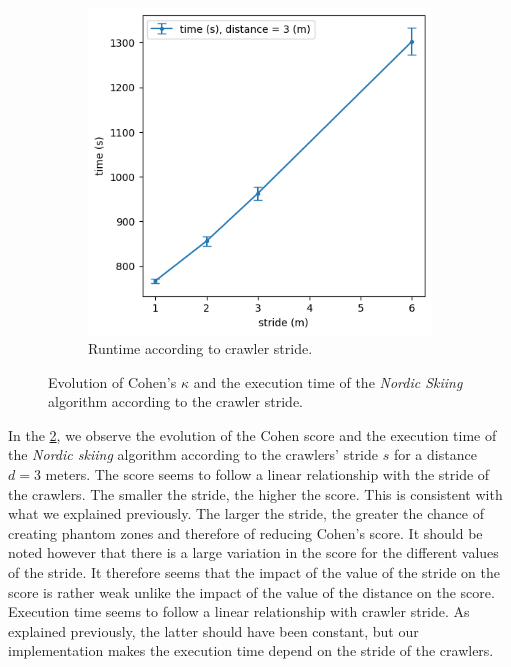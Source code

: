 \begin{figure}[h!]
\begin{subfigure}[t]{0.49\linewidth}
		\includegraphics[width=\linewidth]{graphics/ski_nordique-time_vs_stride.png}
		\caption{Runtime according to crawler stride.}
		\label{fig:ski_nordique-time_vs_stride}
	\end{subfigure}
	\caption{Evolution of Cohen's $\kappa$ and the execution time of the \textit{Nordic Skiing} algorithm according to the crawler stride.}
	\label{fig:ski_nordique-stride}
\end{figure}

In the \ref{fig:ski_nordique-stride}, we observe the evolution of the Cohen score and the execution time of the \textit{Nordic skiing} algorithm according to the crawlers' stride $s$ for a distance $d = 3$ meters.
The score seems to follow a linear relationship with the stride of the crawlers.
The smaller the stride, the higher the score.
This is consistent with what we explained previously.
The larger the stride, the greater the chance of creating phantom zones and therefore of reducing Cohen's score.
It should be noted however that there is a large variation in the score for the different values of the stride.
It therefore seems that the impact of the value of the stride on the score is rather weak unlike the impact of the value of the distance on the score.
Execution time seems to follow a linear relationship with crawler stride.
As explained previously, the latter should have been constant, but our implementation makes the execution time depend on the stride of the crawlers.

